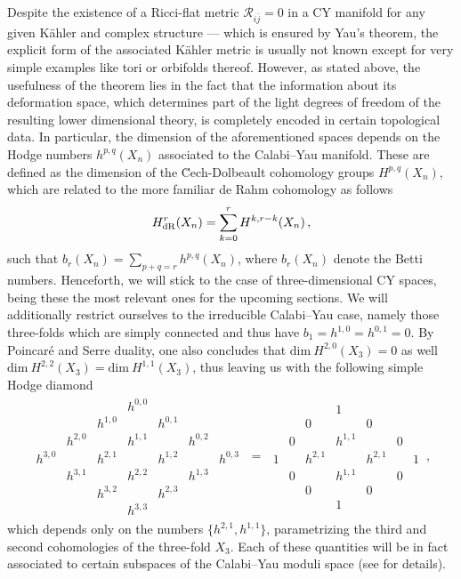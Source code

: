 Despite the existence of a Ricci-flat metric $\mathcal{R}_{i \bar j}=0$ in a CY manifold for any given K\"ahler and complex structure --- which is ensured by Yau's theorem, the explicit form of the associated K\"ahler metric is usually not known except for very simple examples like tori or orbifolds thereof. However, as stated above, the usefulness of the theorem lies in the fact that the information about its deformation space, which determines part of the light degrees of freedom of the resulting lower dimensional theory, is completely encoded in certain topological data. In particular, the dimension of the aforementioned spaces depends on the Hodge numbers $h^{p,q} (X_n)$ associated to the Calabi--Yau manifold. These are defined as the dimension of the \u Cech-Dolbeault cohomology groups $H^{p,q} (X_n)$, which are related to the more familiar de Rahm cohomology as follows
%
\begin{align}
  H^r_{\rm{dR}}(X_n) = \sum_{k=0}^r H^{k,r-k}(X_n)\, ,
\end{align}
%
such that $b_r(X_n)=\sum_{p+q=r} h^{p,q} (X_n)$, where $b_r(X_n)$ denote the Betti numbers. Henceforth, we will stick to the case of three-dimensional CY spaces, being these the most relevant ones for the upcoming sections. We will additionally restrict ourselves to the irreducible Calabi--Yau case, namely those three-folds which are simply connected and thus have $b_1=h^{1,0}=h^{0,1}=0$. By Poincaré and Serre duality, one also concludes that $\text{dim}\ H^{2,0} (X_3)=0$ as well $\text{dim}\ H^{2,2} (X_3) = \text{dim}\ H^{1,1} (X_3)$, thus leaving us with the following simple Hodge diamond
%
 \begin{align}\label{Hodgediamond}
\begin{matrix}&&&h^{0,0} & & &\\ &&h^{1,0} & &h^{0,1} && \\ &h^{2,0}&&h^{1,1}&&h^{0,2}&\\ h^{3,0}&&h^{2,1} &&h^{1,2}&&h^{0,3}\\ &h^{3,1}&&h^{2,2}&&h^{1,3}&\\ &&h^{3,2}&&h^{2,3}&& \\ &&&h^{3,3} &&&\end{matrix}\; \stackrel{ \text{}}{=}\;\begin{matrix}&&&1& & &\\ &&0 & &0&& \\ &0&&h^{1,1}&&0&\\ 1&&h^{2,1} &&h^{2,1}&&1\\ &0&&h^{1,1}&&0&\\ &&0&&0&& \\ &&&1 &&&\end{matrix}\, ,
\end{align}
%
which depends only on the numbers $\{ h^{2,1}, h^{1,1}\}$, parametrizing the third and second cohomologies of the three-fold $X_3$. Each of these quantities will be in fact associated to certain subspaces of the Calabi--Yau moduli space (see \cite{Candelas:1990pi} for details).

